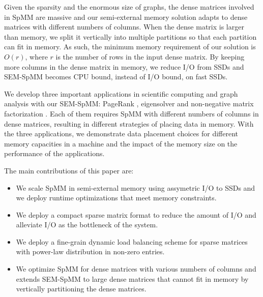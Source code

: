 Given the sparsity and the enormous size of graphs, the dense matrices involved
in SpMM are massive and our semi-external memory solution adapts to
dense matrices with different numbers of columns. When the dense matrix is
larger than memory, we split it
vertically into multiple partitions so that each partition can fit in
memory. As such, the minimum memory requirement of our solution is $O(r)$,
where $r$ is the number of rows in the input dense matrix. By keeping more columns
in the dense matrix in memory, we reduce I/O from SSDs and SEM-SpMM becomes
CPU bound, instead of I/O bound, on fast SSDs.

We develop three important applications in scientific computing and graph
analysis
with our SEM-SpMM: PageRank \cite{pagerank}, eigensolver \cite{anasazi} and
non-negative matrix factorization \cite{nmf}. Each of them requires SpMM with
different numbers of columns in dense matrices, resulting in different
strategies of placing data in memory. With the three applications, we
demonstrate data placement choices for different memory capacities in a machine
and the impact of the memory size on the performance of the applications.


The main contributions of this paper are:
\begin{itemize}
	\item We scale SpMM in semi-external memory using assymetric I/O to SSDs and we
    deploy runtime optimizations that meet memory constraints.
	\item We deploy a compact sparse matrix format to reduce the amount of
		I/O and alleviate I/O as the bottleneck of the system.
	\item We deploy a fine-grain dynamic load balancing scheme for sparse
		matrices with power-law distribution in non-zero entries.
	\item We optimize SpMM for dense matrices with various numbers of columns
		and extends SEM-SpMM to large dense matrices that cannot fit in memory
		by vertically partitioning the dense matrices.
\end{itemize}

